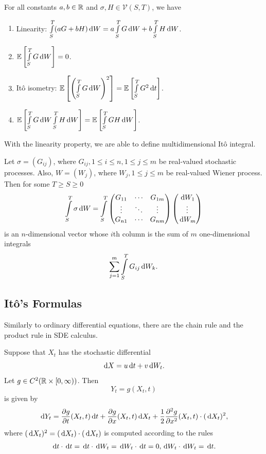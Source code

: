 \begin{theorem}
  \label{theorem:prop}
  For all constants $a,b\in\mathbb{R}$ and $\sigma,H\in\mathcal{V}(S,T)$, we have
  \begin{enumerate}
    \item Linearity: $\int\limits_{S}^T(aG+bH)\,\mathrm{d} W = a\int\limits_{S}^TG\,\mathrm{d} W+b\int\limits_{S}^TH\,\mathrm{d} W$.
    \item $\mathbb{E}\left[\int\limits_{S}^TG\,\mathrm{d} W\right]=0$.
    \item Itô isometry: $\mathbb{E}\left[\left(\int\limits_{S}^TG\,\mathrm{d} W\right)^2\right]=\mathbb{E}\left[\int\limits_{S}^TG^2\,\mathrm{d} t\right]$.
    \item $\mathbb{E}\left[\int\limits_{S}^TG\,\mathrm{d} W\int\limits_{S}^TH\,\mathrm{d} W\right]=\mathbb{E}\left[\int\limits_{S}^TGH\,\mathrm{d} W\right]$.
  \end{enumerate}
\end{theorem}

With the linearity property, we are able to define multidimensional Itô integral.

\begin{definition}
  Let $\sigma=(G_{ij})$, where $G_{ij}, 1\le i\le n, 1\le j\le m$ be real-valued stochastic processes. Also, $W=(W_j)$, where $W_j,1\le j\le m$ be real-valued Wiener process. Then for some $T\ge S\ge 0$
  \begin{equation}
    \int\limits_S^T \sigma\,\mathrm{d} W=\int\limits_S^T\begin{pmatrix}
      G_{11} & \cdots  & G_{1m} \\
      \vdots & \ddots & \vdots \\
      G_{n1} & \cdots  & G_{nm}
    \end{pmatrix}\begin{pmatrix}
      \,\mathrm{d} W_1 \\\vdots\\\,\mathrm{d} W_m
    \end{pmatrix}
  \end{equation}
  is an $n$-dimensional vector whose $i$th column is the sum of $m$ one-dimensional integrals
  $$\sum\limits_{j=1}^m \int\limits_S^T G_{ij}\,\mathrm{d} W_k.$$
\end{definition}

\subsection{Itô's Formulas}
Similarly to ordinary differential equations, there are the chain rule and the product rule in SDE calculus.
\begin{theorem}
  Suppose that $X_t$ has the stochastic differential
  $$\,\mathrm{d} X = u\,\mathrm{d} t + v\,\mathrm{d} W_t.$$
  Let $g\in C^2(\mathbb{R}\times[0,\infty))$. Then
  $$Y_t=g(X_t,t)$$
  is given by
  \begin{equation}
    \label{equation:1dchainrule}
    \,\mathrm{d} Y_t=\dfrac{\partial g}{\partial t}(X_t,t)\,\mathrm{d} t+\dfrac{\partial g}{\partial x}(X_t,t)\,\mathrm{d} X_t+\dfrac{1}{2}\dfrac{\partial^2 g}{\partial x^2}(X_t,t)\cdot(\,\mathrm{d} X_t)^2,
  \end{equation}
  where $(\,\mathrm{d} X_t)^2=(\,\mathrm{d} X_t)\cdot(\,\mathrm{d} X_t)$ is computed according to the rules
  $$\,\mathrm{d} t\cdot\,\mathrm{d} t = \,\mathrm{d} t\cdot\,\mathrm{d} W_t = \,\mathrm{d} W_t\cdot\,\mathrm{d} t = 0, \,\mathrm{d} W_t\cdot\,\mathrm{d} W_t=\,\mathrm{d} t.$$
\end{theorem}


